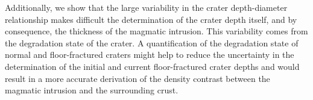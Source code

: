 Additionally,  we  show  that  the large  variability  in  the  crater
depth-diameter relationship  makes difficult the determination  of the
crater depth itself, and by consequence, the thickness of the magmatic
intrusion.  This variability  comes from the degradation  state of the
crater.   A quantification  of  the degradation  state  of normal  and
floor-fractured craters  might help to  reduce the uncertainty  in the
determination of the initial and current floor-fractured crater depths
and would result in a more accurate derivation of the density contrast
between the magmatic intrusion and the surrounding crust.


